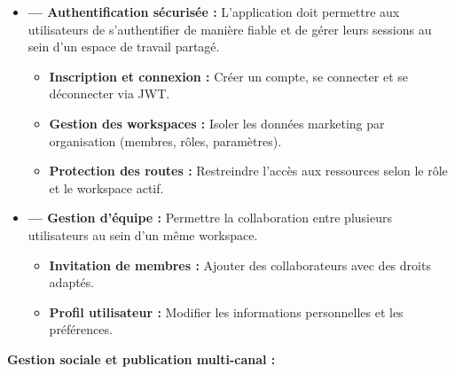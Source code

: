 \documentclass[12pt,a4paper]{report}
\numberwithin{figure}{chapter}
\numberwithin{table}{chapter}
\begin{document}
\begin{itemize}[leftmargin=2em,itemsep=6pt]
\item[] \textbf{--- Authentification sécurisée :} L’application doit permettre aux utilisateurs de s’authentifier de manière fiable et de gérer leurs sessions au sein d’un espace de travail partagé.
\begin{itemize}[label=$\checkmark$,leftmargin=2em,itemsep=3pt]
\item \textbf{Inscription et connexion :} Créer un compte, se connecter et se déconnecter via JWT.
\item \textbf{Gestion des workspaces :} Isoler les données marketing par organisation (membres, rôles, paramètres).
\item \textbf{Protection des routes :} Restreindre l’accès aux ressources selon le rôle et le workspace actif.
\end{itemize}

\item[] \textbf{--- Gestion d’équipe :} Permettre la collaboration entre plusieurs utilisateurs au sein d’un même workspace.
\begin{itemize}[label=$\checkmark$,leftmargin=2em,itemsep=3pt]
\item \textbf{Invitation de membres :} Ajouter des collaborateurs avec des droits adaptés.
\item \textbf{Profil utilisateur :} Modifier les informations personnelles et les préférences.
\end{itemize}
\end{itemize}

\textbf{Gestion sociale et publication multi-canal :}
\end{document}
